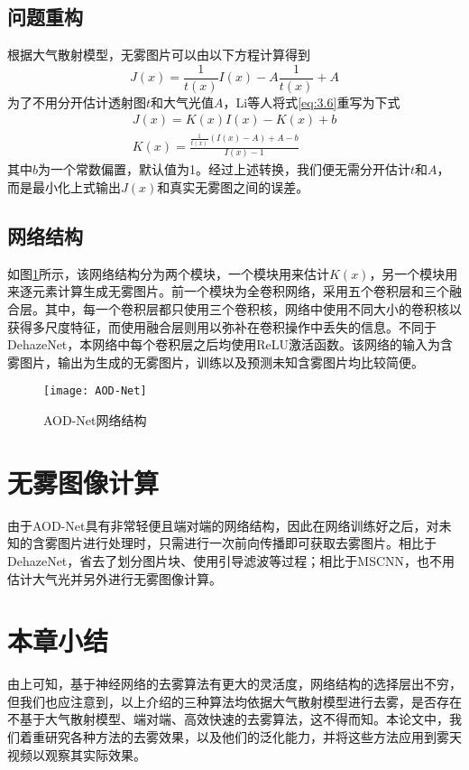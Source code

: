 \documentclass[a4paper, 12pt, oneside]{report}
\begin{document}
{\subsection{问题重构\quad}
根据大气散射模型，无雾图片可以由以下方程计算得到
\begin{equation} \label{eq:3.6}
J(x) = \frac{1}{t(x)}I(x) - A\frac{1}{t(x)} + A
\end{equation}
为了不用分开估计透射图$t$和大气光值$A$，Li等人将式\ref{eq:3.6}重写为下式
\begin{equation} \label{eq:3.7}
\begin{aligned}
J(x) = K(x)I(x) - K(x) + b \\
K(x) = \frac{\frac{1}{t(x)}(I(x) - A) + A - b}{I(x) - 1}
\end{aligned}
\end{equation}
其中$b$为一个常数偏置，默认值为1。经过上述转换，我们便无需分开估计$t$和$A$，而是最小化上式输出$J(x)$和真实无雾图之间的误差。

\subsection{网络结构\quad}

如图\ref{fig:3.9}所示，该网络结构分为两个模块，一个模块用来估计$K(x)$，另一个模块用来逐元素计算生成无雾图片。前一个模块为全卷积网络，采用五个卷积层和三个融合层。其中，每一个卷积层都只使用三个卷积核，网络中使用不同大小的卷积核以获得多尺度特征，而使用融合层则用以弥补在卷积操作中丢失的信息。不同于DehazeNet，本网络中每个卷积层之后均使用ReLU激活函数。该网络的输入为含雾图片，输出为生成的无雾图片，训练以及预测未知含雾图片均比较简便。
\begin{figure}[H]
\centering
\texttt{[image: AOD-Net]}
\caption{AOD-Net网络结构}
\label{fig:3.9}
\end{figure}

\section{无雾图像计算\quad}
由于AOD-Net具有非常轻便且端对端的网络结构，因此在网络训练好之后，对未知的含雾图片进行处理时，只需进行一次前向传播即可获取去雾图片。相比于DehazeNet，省去了划分图片块、使用引导滤波等过程；相比于MSCNN，也不用估计大气光并另外进行无雾图像计算。

\section{本章小结\quad}
由上可知，基于神经网络的去雾算法有更大的灵活度，网络结构的选择层出不穷，但我们也应注意到，以上介绍的三种算法均依据大气散射模型进行去雾，是否存在不基于大气散射模型、端对端、高效快速的去雾算法，这不得而知。本论文中，我们着重研究各种方法的去雾效果，以及他们的泛化能力，并将这些方法应用到雾天视频以观察其实际效果。

}
\end{document}
